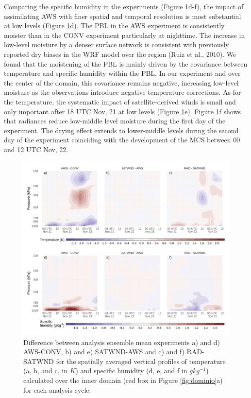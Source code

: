 \documentclass[final,5p,times,twocolumn,authoryear]{elsarticle} %
\begin{document}
Comparing the specific humidity in the experiments (Figure \ref{fig:TQ-diff}d-f), the impact of assimilating AWS with finer spatial and temporal resolution is most substantial at low levels (Figure \ref{fig:TQ-diff}d). The PBL in the AWS experiment is consistently moister than in the CONV experiment particularly at nighttime. The increase in low-level moisture by a denser surface network is consistent with previously reported dry biases in the WRF model over the region (Ruiz et al., 2010). We found that the moistening of the PBL is mainly driven by the covariance between temperature and specific humidity within the PBL. In our experiment and over the center of the domain, this covariance remains negative, increasing low-level moisture as the observations introduce negative temperature corrections. As for the temperature, the systematic impact of satellite-derived winds is small and only important after 18 UTC Nov, 21 at low levels (Figure \ref{fig:TQ-diff}e). Figure \ref{fig:TQ-diff}f shows that radiances reduce low-middle level moisture during the first day of the experiment. The drying effect extends to lower-middle levels during the second day of the experiment coinciding with the development of the MCS between 00 and 12 UTC Nov, 22.



\begin{figure}[th]

{\centering \includegraphics{../figures/TQ-diff-1} 

}

\caption{Difference between analysis ensemble mean experiments a) and d) AWS-CONV, b) and e) SATWND-AWS and c) and f) RAD-SATWND for the spatially averaged vertical profiles of temperature (a, b, and c, in \(K\)) and specific humidity (d, e, and f in \(gkg^{-1}\)) calculated over the inner domain (red box in Figure \ref{fig:dominio}a) for each analysis cycle.}\label{fig:TQ-diff}
\end{figure}
\end{document}
